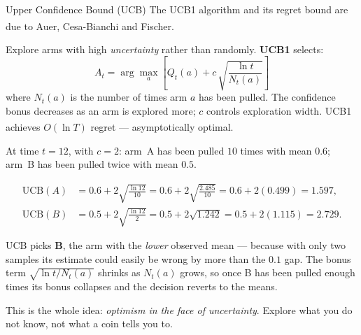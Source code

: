 \begin{v3topic}{Upper Confidence Bound (UCB)}
        The UCB1 algorithm and its regret bound are due to Auer,
        Cesa-Bianchi and
        Fischer\textsuperscript{\cite{auerFinitetimeAnalysisMultiarmed2002}}.

        Explore arms with high \emph{uncertainty} rather than randomly.
        \textbf{UCB1} selects:
        \begin{equation}
            A_t = \arg\max_a \left[Q_t(a) + c\,\sqrt{\frac{\ln t}{N_t(a)}}\right]
        \end{equation}
        where $N_t(a)$ is the number of times arm $a$ has been pulled.
        The confidence bonus decreases as an arm is explored more; $c$
        controls exploration width.
        UCB1 achieves $O(\ln T)$ regret --- asymptotically
        optimal.\textsuperscript{\cite[][p.~337]{hurbansGrokkingArtificialIntelligence2020}}

\begin{workedexample}
At time $t = 12$, with $c = 2$:
arm~A has been pulled $10$ times with mean $0.6$; arm~B has been pulled twice
with mean $0.5$.

\[
\begin{aligned}
  \text{UCB}(A) &= 0.6 + 2\sqrt{\tfrac{\ln 12}{10}}
    = 0.6 + 2\sqrt{\tfrac{2.485}{10}}
    = 0.6 + 2(0.499) = 1.597,\\[3pt]
  \text{UCB}(B) &= 0.5 + 2\sqrt{\tfrac{\ln 12}{2}}
    = 0.5 + 2\sqrt{1.242}
    = 0.5 + 2(1.115) = 2.729 .
\end{aligned}
\]

UCB picks \textbf{B}, the arm with the \emph{lower} observed mean --- because
with only two samples its estimate could easily be wrong by more than the
$0.1$ gap. The bonus term $\sqrt{\ln t / N_t(a)}$ shrinks as $N_t(a)$ grows, so
once B has been pulled enough times its bonus collapses and the decision
reverts to the means.

This is the whole idea: \emph{optimism in the face of uncertainty}. Explore
what you do not know, not what a coin tells you to.
\end{workedexample}

\end{v3topic}
